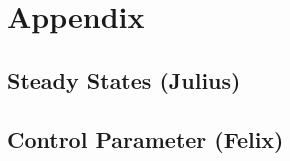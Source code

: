 \chapter{Appendix}
\section{Steady States (Julius)}

\newpage
\section{Control Parameter (Felix)}\label{Control Parameters}



